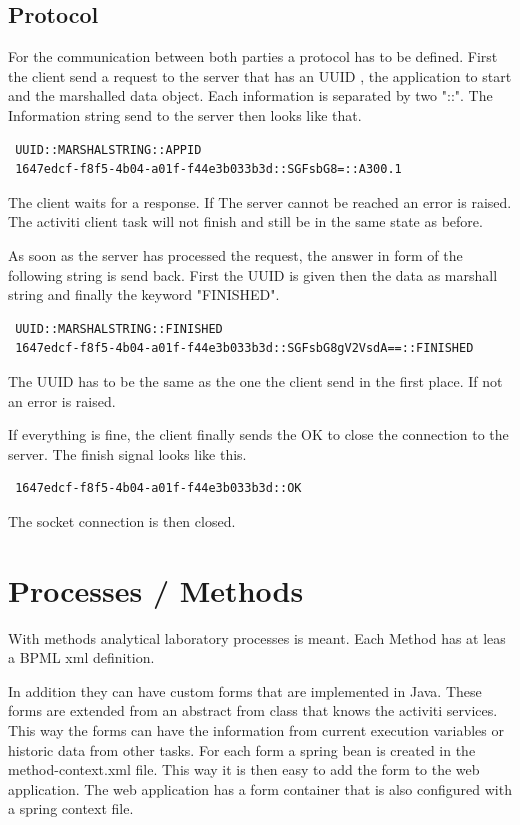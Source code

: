 \documentclass[paper=a4,twoside=false,BCOR=0mm,DIV=calc,fontsize=12pt]{scrartcl}
\begin{document}
\subsection{Protocol}
For the communication between both parties a protocol has to be defined. 
First the client send a request to the server that has an UUID \cite{uuid}, the application to start and the marshalled data object.
Each information is separated by two "::". The Information string send to the server then looks like that.
\begin{verbatim}
 UUID::MARSHALSTRING::APPID
 1647edcf-f8f5-4b04-a01f-f44e3b033b3d::SGFsbG8=::A300.1
\end{verbatim}

The client waits for a response. If The server cannot be reached an error is raised. 
The activiti client task will not finish and still be in the same state as before.

As soon as the server has processed the request, the answer in form of the following string is send back.
First the UUID is given then the data as marshall string and finally the keyword "FINISHED".

\begin{verbatim}
 UUID::MARSHALSTRING::FINISHED
 1647edcf-f8f5-4b04-a01f-f44e3b033b3d::SGFsbG8gV2VsdA==::FINISHED
\end{verbatim}

The UUID has to be the same as the one the client send in the first place. If not an error is raised.

If everything is fine, the client finally sends the OK to close the connection to the server.
The finish signal looks like this.
\begin{verbatim}
 1647edcf-f8f5-4b04-a01f-f44e3b033b3d::OK
\end{verbatim}
The socket connection is then closed.

\section{Processes / Methods}
With methods analytical laboratory processes is meant. Each Method has at leas a BPML xml definition.

In addition they can have custom forms that are implemented in Java. These forms are extended from an abstract from class that knows the activiti services. This way the forms can have the information from current execution variables or historic data from other tasks. For each form a spring bean is created in the method-context.xml file. This way it is then easy to add the form to the web application. The web application has a form container that is also configured with a spring context file.
\end{document}
